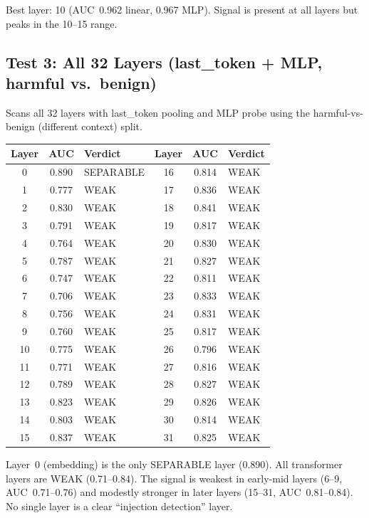 \documentclass[11pt]{article}
\newcommand{\good}[1]{\textcolor{good}{#1}}
\newcommand{\bad}[1]{\textcolor{bad}{#1}}
\begin{document}
Best layer: 10 (AUC~0.962 linear, 0.967 MLP). Signal is present at all
layers but peaks in the 10--15 range.

\subsection{Test 3: All 32 Layers (last\_token + MLP, harmful vs.\ benign)}

Scans all 32 layers with last\_token pooling and MLP probe using the
harmful-vs-benign (different context) split.

\begin{center}
\small
\begin{tabular}{ccl@{\qquad}ccl}
\toprule
Layer & AUC & Verdict & Layer & AUC & Verdict \\
\midrule
0  & \good{0.890} & SEPARABLE & 16 & 0.814 & WEAK \\
1  & 0.777 & WEAK & 17 & 0.836 & WEAK \\
2  & 0.830 & WEAK & 18 & 0.841 & WEAK \\
3  & 0.791 & WEAK & 19 & 0.817 & WEAK \\
4  & 0.764 & WEAK & 20 & 0.830 & WEAK \\
5  & 0.787 & WEAK & 21 & 0.827 & WEAK \\
6  & 0.747 & WEAK & 22 & 0.811 & WEAK \\
7  & \bad{0.706} & WEAK & 23 & 0.833 & WEAK \\
8  & 0.756 & WEAK & 24 & 0.831 & WEAK \\
9  & 0.760 & WEAK & 25 & 0.817 & WEAK \\
10 & 0.775 & WEAK & 26 & 0.796 & WEAK \\
11 & 0.771 & WEAK & 27 & 0.816 & WEAK \\
12 & 0.789 & WEAK & 28 & 0.827 & WEAK \\
13 & 0.823 & WEAK & 29 & 0.826 & WEAK \\
14 & 0.803 & WEAK & 30 & 0.814 & WEAK \\
15 & 0.837 & WEAK & 31 & 0.825 & WEAK \\
\bottomrule
\end{tabular}
\end{center}

\noindent Layer~0 (embedding) is the only SEPARABLE layer (0.890). All
transformer layers are WEAK (0.71--0.84). The signal is weakest in early-mid
layers (6--9, AUC~0.71--0.76) and modestly stronger in later layers (15--31,
AUC~0.81--0.84). No single layer is a clear ``injection detection'' layer.
\end{document}
